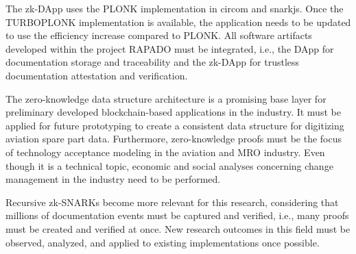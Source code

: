 The zk-DApp uses the PLONK implementation in circom and snarkjs. Once the TURBOPLONK implementation is available, the application needs to be updated to use the efficiency increase compared to PLONK. All software artifacts developed within the project RAPADO must be integrated, i.e., the DApp for documentation storage and traceability and the zk-DApp for trustless documentation attestation and verification. 

The zero-knowledge data structure architecture is a promising base layer for preliminary developed blockchain-based applications in the industry. It must be applied for future prototyping to create a consistent data structure for digitizing aviation spare part data. Furthermore, zero-knowledge proofs must be the focus of technology acceptance modeling in the aviation and MRO industry. Even though it is a technical topic, economic and social analyses concerning change management in the industry need to be performed. 

Recursive zk-SNARKs become more relevant for this research, considering that millions of documentation events must be captured and verified, i.e., many proofs must be created and verified at once. New research outcomes in this field must be observed, analyzed, and applied to existing implementations once possible.